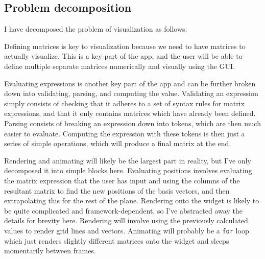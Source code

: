 \documentclass[../main.tex]{subfiles}
\begin{document}
\subsection{Problem decomposition\label{design:problem-decomposition}}

I have decomposed the problem of visualization as follows:
\begin{center}
\end{center}
Defining matrices is key to visualization because we need to have matrices to actually visualize. This is a key part of the app, and the user will be able to define multiple separate matrices numerically and visually using the GUI.

Evaluating expressions is another key part of the app and can be further broken down into validating, parsing, and computing the value. Validating an expression simply consists of checking that it adheres to a set of syntax rules for matrix expressions, and that it only contains matrices which have already been defined. Parsing consists of breaking an expression down into tokens, which are then much easier to evaluate. Computing the expression with these tokens is then just a series of simple operations, which will produce a final matrix at the end.

Rendering and animating will likely be the largest part in reality, but I've only decomposed it into simple blocks here. Evaluating positions involves evaluating the matrix expression that the user has input and using the columns of the resultant matrix to find the new positions of the basis vectors, and then extrapolating this for the rest of the plane. Rendering onto the widget is likely to be quite complicated and framework-dependent, so I've abstracted away the details for brevity here. Rendering will involve using the previously calculated values to render grid lines and vectors. Animating will probably be a \texttt{for} loop which just renders slightly different matrices onto the widget and sleeps momentarily between frames.
\end{document}
